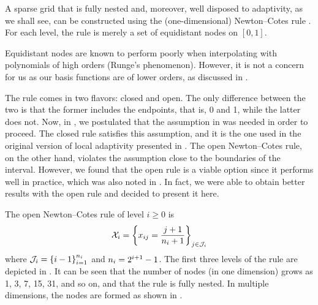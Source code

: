 A sparse grid that is fully nested and, moreover, well disposed to adaptivity,
as we shall see, can be constructed using the (one-dimensional) Newton--Cotes
rule \cite{ma2009}. For each level, the rule is merely a set of equidistant
nodes on $[0, 1]$.

\begin{remark}
Equidistant nodes are known to perform poorly when interpolating with
polynomials of high orders (Runge's phenomenon). However, it is not a concern
for us as our basis functions are of lower orders, as discussed in .
\end{remark}

The rule comes in two flavors: closed and open. The only difference between the
two is that the former includes the endpoints, that is, 0 and 1, while the
latter does not. Now, in , we postulated that the assumption in
 was needed in order to proceed. The closed rule
satisfies this assumption, and it is the one used in the original version of
local adaptivity presented in \cite{ma2009}. The open Newton--Cotes rule, on the
other hand, violates the assumption close to the boundaries of the interval.
However, we found that the open rule is a viable option since it performs well
in practice, which was also noted in \cite{klimke2006}. In fact, we were able to
obtain better results with the open rule and decided to present it here.


The open Newton--Cotes rule of level $i \geq 0$ is
\begin{equation} \elab{newton-cotes-grid}
  \X_i = \left\{ x_{ij} = \frac{j + 1}{\n_i + 1} \right\}_{j \in \oindex_i}
\end{equation}
where $\mathcal{J}_i = \left\{ i - 1 \right\}_{i = 1}^{n_i}$ and $n_i = 2^{i + 1}
- 1$. The first three levels of the rule are depicted in . It can be
seen that the number of nodes (in one dimension) grows as 1, 3, 7, 15, 31, and
so on, and that the rule is fully nested. In multiple dimensions, the nodes are
formed as shown in .
